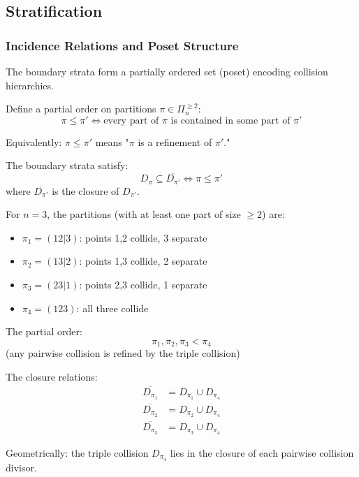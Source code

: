 \subsection{Stratification}

\subsubsection{Incidence Relations and Poset Structure}

The boundary strata form a partially ordered set (poset) encoding collision hierarchies.

\begin{definition}\label{def:stratification-poset}
Define a partial order on partitions $\pi \in \Pi_n^{\geq 2}$:
$$\pi \leq \pi' \iff \text{every part of } \pi \text{ is contained in some part of } \pi'$$

Equivalently: $\pi \leq \pi'$ means "$\pi$ is a refinement of $\pi'$."

The boundary strata satisfy:
$$D_\pi \subseteq \overline{D_{\pi'}} \iff \pi \leq \pi'$$
where $\overline{D_{\pi'}}$ is the closure of $D_{\pi'}$.
\end{definition}

\begin{example}[Poset for $n=3$]\label{ex:poset-n3}
For $n=3$, the partitions (with at least one part of size $\geq 2$) are:
\begin{itemize}
\item $\pi_1 = (12|3)$: points 1,2 collide, 3 separate
\item $\pi_2 = (13|2)$: points 1,3 collide, 2 separate  
\item $\pi_3 = (23|1)$: points 2,3 collide, 1 separate
\item $\pi_4 = (123)$: all three collide
\end{itemize}

The partial order:
$$\pi_1, \pi_2, \pi_3 < \pi_4$$
(any pairwise collision is refined by the triple collision)

The closure relations:
\begin{align*}
\overline{D_{\pi_1}} &= D_{\pi_1} \cup D_{\pi_4} \\
\overline{D_{\pi_2}} &= D_{\pi_2} \cup D_{\pi_4} \\
\overline{D_{\pi_3}} &= D_{\pi_3} \cup D_{\pi_4}
\end{align*}

Geometrically: the triple collision $D_{\pi_4}$ lies in the closure of each pairwise collision divisor.
\end{example}

